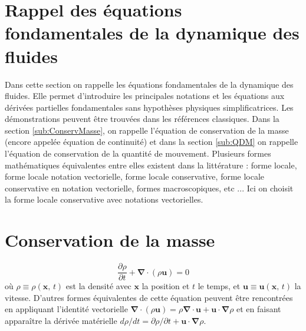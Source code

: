 \chapter{Rappel des \'equations fondamentales de la dynamique des fluides}

Dans cette section on rappelle les \'equations fondamentales de la dynamique
des fluides. Elle permet d'introduire les principales notations et
les \'equations aux d\'eriv\'ees partielles fondamentales sans hypoth\`eses
physiques simplificatrices. Les d\'emonstrations peuvent \^etre trouv\'ees
dans les r\'ef\'erences classiques. Dans la section \ref{sub:ConservMasse},
on rappelle l'\'equation de conservation de la masse (encore appel\'ee
\'equation de continuit\'e) et dans la section \ref{sub:QDM} on rappelle
l'\'equation de conservation de la quantit\'e de mouvement. Plusieurs
formes math\'ematiques \'equivalentes entre elles existent dans la litt\'erature
: forme locale, forme locale notation vectorielle, forme locale conservative,
forme locale conservative en notation vectorielle, formes macroscopiques,
etc ... Ici on choisit la forme locale conservative avec notations
vectorielles.


\chapter{\label{sub:ConservMasse}Conservation de la masse}
\begin{equation}
\frac{\partial\rho}{\partial t}+\boldsymbol{\nabla}\cdot(\rho\mathbf{u})=0\label{eq:ConvMasse}
\end{equation}
o\`u $\rho\equiv\rho(\mathbf{x},\,t)$ est la densit\'e avec $\mathbf{x}$
la position et $t$ le temps, et $\mathbf{u}\equiv\mathbf{u}(\mathbf{x},\,t)$
la vitesse. D'autres formes \'equivalentes de cette \'equation peuvent
\^etre rencontr\'ees en appliquant l'identit\'e vectorielle $\boldsymbol{\nabla}\cdot(\rho\mathbf{u})=\rho\boldsymbol{\nabla}\cdot\mathbf{u}+\mathbf{u}\cdot\boldsymbol{\nabla}\rho$
et en faisant appara\^itre la d\'eriv\'ee mat\'erielle $d\rho/dt=\partial\rho/\partial t+\mathbf{u}\cdot\boldsymbol{\nabla}\rho$.


